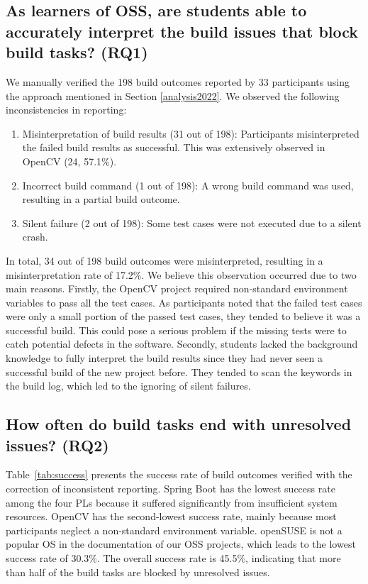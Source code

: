 \documentclass[10pt, conference]{IEEEtran}
\begin{document}
\subsection{As learners of OSS, are students able to accurately interpret the build issues that block build tasks? (RQ1)}
\label{sec:RQ1}
We manually verified the 198 build outcomes reported by 33 participants using the approach mentioned in Section \ref{analysis2022}. We observed the following inconsistencies in reporting:
\begin{enumerate}[leftmargin=*]
    \item Misinterpretation of build results (31 out of 198): Participants misinterpreted the failed build results as successful. This was extensively observed in OpenCV (24, 57.1\%).
    \item Incorrect build command (1 out of 198): A wrong build command was used, resulting in a partial build outcome.
    \item Silent failure (2 out of 198): Some test cases were not executed due to a silent crash.
\end{enumerate}
In total, 34 out of 198 build outcomes were misinterpreted, resulting in a misinterpretation rate of 17.2\%. We believe this observation occurred due to two main reasons.
Firstly, the OpenCV project required non-standard environment variables to pass all the test cases. As participants noted that the failed test cases were only a small portion of the passed test cases, they tended to believe it was a successful build. This could pose a serious problem if the missing tests were to catch potential defects in the software.
Secondly, students lacked the background knowledge to fully interpret the build results since they had never seen a successful build of the new project before. They tended to scan the keywords in the build log, which led to the ignoring of silent failures.

\subsection{How often do build tasks end with unresolved issues? (RQ2)}
\label{sec:RQ2}
Table~\ref{tab:success} presents the success rate of build outcomes verified with the correction of inconsistent reporting. Spring Boot has the lowest success rate among the four PLs because it suffered significantly from insufficient system resources. OpenCV has the second-lowest success rate, mainly because most participants neglect a non-standard environment variable. openSUSE is not a popular OS in the documentation of our OSS projects, which leads to the lowest success rate of 30.3\%. The overall success rate is 45.5\%, indicating that more than half of the build tasks are blocked by unresolved issues.
\end{document}
